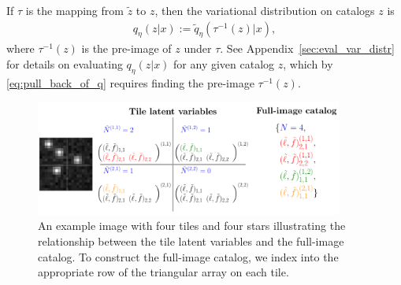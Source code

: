 If $\tau$ is the mapping from $\tilde z$ to $z$, 
then the variational distribution on catalogs $z$ is
\begin{align}
    q_\eta(z | x) := \tilde q_\eta(\tau^{-1}(z) | x),
    \label{eq:pull_back_of_q}
\end{align}
where $\tau^{-1}(z)$ is the pre-image of $z$ under $\tau$. 
See Appendix~\ref{sec:eval_var_distr} for details on evaluating $q_\eta(z | x)$ for any given catalog $z$, which by \eqref{eq:pull_back_of_q} requires finding the pre-image $\tau^{-1}(z)$.







\begin{figure}[tb]
    \centering
    \includegraphics[width = 0.9\textwidth]{figures/vi_figures/tile_to_full_schematic.png}
    \vspace{-0.6cm}
    \caption{An example image with four tiles and four stars illustrating the relationship between the tile latent variables and the full-image catalog. 
    To construct the full-image catalog, we index into the appropriate row of the triangular array on each tile.}
    \label{fig:tile_to_full_schm}
\end{figure}


